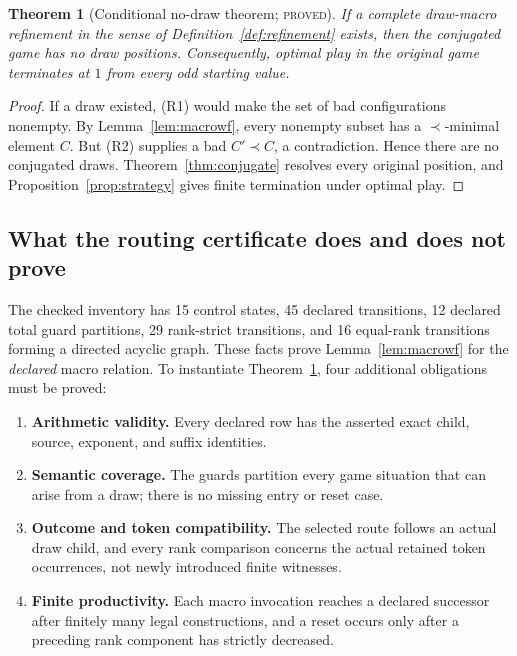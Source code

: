 \documentclass[11pt]{article}
\newtheorem{theorem}{Theorem}[section]
\theoremstyle{definition}
\newcommand{\proved}{\textsc{proved}}
\begin{document}
\begin{theorem}[Conditional no-draw theorem; \proved]\label{thm:conditional}
If a complete draw-macro refinement in the sense of
Definition~\ref{def:refinement} exists, then the conjugated game has no draw
positions.  Consequently, optimal play in the original game terminates at
$1$ from every odd starting value.
\end{theorem}

\begin{proof}
If a draw existed, (R1) would make the set of bad configurations nonempty.
By Lemma~\ref{lem:macrowf}, every nonempty subset has a $\prec$-minimal
element $C$.  But (R2) supplies a bad $C'\prec C$, a contradiction.  Hence
there are no conjugated draws.  Theorem~\ref{thm:conjugate} resolves every
original position, and Proposition~\ref{prop:strategy} gives finite
termination under optimal play.
\end{proof}

\subsection{What the routing certificate does and does not prove}

The checked inventory has 15 control states, 45 declared transitions, 12
declared total guard partitions, 29 rank-strict transitions, and 16
equal-rank transitions forming a directed acyclic graph.  These facts prove
Lemma~\ref{lem:macrowf} for the \emph{declared} macro relation.  To instantiate
Theorem~\ref{thm:conditional}, four additional obligations must be proved:

\begin{enumerate}
\item[(H1)] \textbf{Arithmetic validity.}  Every declared row has the asserted
      exact child, source, exponent, and suffix identities.
\item[(H2)] \textbf{Semantic coverage.}  The guards partition every game situation
      that can arise from a draw; there is no missing entry or reset case.
\item[(H3)] \textbf{Outcome and token compatibility.}  The selected route follows
      an actual draw child, and every rank comparison concerns the actual
      retained token occurrences, not newly introduced finite witnesses.
\item[(H4)] \textbf{Finite productivity.}  Each macro invocation reaches a declared
      successor after finitely many legal constructions, and a reset occurs
      only after a preceding rank component has strictly decreased.
\end{enumerate}
\end{document}
